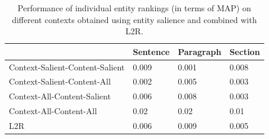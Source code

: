 \begin{table}[t]
\caption{Performance of individual entity rankings (in terms of MAP) on different contexts obtained using entity salience and combined with L2R.}
\label{tab:Results-Entity-Rankings-Sal}
\begin{tabular}{@{}llll@{}}
\toprule
                                & Sentence & Paragraph & Section \\ \midrule
Context-Salient-Content-Salient & 0.009    & 0.001     & 0.008   \\
Context-Salient-Content-All     & 0.002    & 0.005     & 0.003   \\
Context-All-Content-Salient     & 0.006    & 0.008     & 0.003   \\
Context-All-Content-All         & 0.02     & 0.02      & 0.01    \\ \midrule
L2R                             & 0.006    & 0.009     & 0.005   \\ \bottomrule
\end{tabular}
\end{table}



